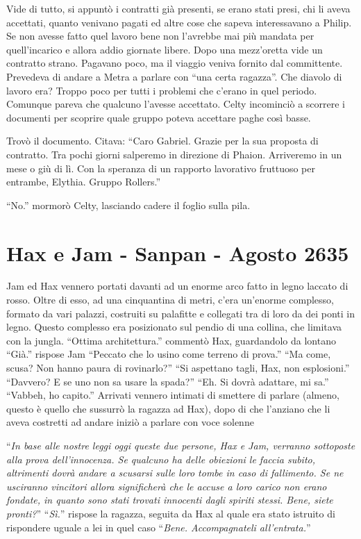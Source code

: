     Vide di tutto, si appuntò i contratti già presenti, se erano stati
    presi, chi li aveva accettati, quanto venivano pagati ed altre cose che
    sapeva interessavano a Philip. Se non avesse fatto quel lavoro bene non
    l'avrebbe mai più mandata per quell'incarico e allora addio giornate
    libere. Dopo una mezz'oretta vide un contratto strano. Pagavano poco,
    ma il viaggio veniva fornito dal committente. Prevedeva di andare a
    Metra a parlare con ``una certa ragazza''. Che diavolo di lavoro era?
    Troppo poco per tutti i problemi che c'erano in quel periodo. Comunque
    pareva che qualcuno l'avesse accettato. Celty incominciò a scorrere i
    documenti per scoprire quale gruppo poteva accettare paghe così basse.

    Trovò il documento. Citava: ``Caro Gabriel. Grazie per la sua proposta
    di contratto. Tra pochi giorni salperemo in direzione di Phaion.
    Arriveremo in un mese o giù di lì. Con la speranza di un rapporto
    lavorativo fruttuoso per entrambe, Elythia. Gruppo Rollers.''

    ``No.'' mormorò Celty, lasciando cadere il foglio sulla pila.

  \section{Hax e Jam - Sanpan - Agosto 2635}

    Jam ed Hax vennero portati davanti ad un enorme arco fatto in legno
    laccato di rosso. Oltre di esso, ad una cinquantina di metri, c'era
    un'enorme complesso, formato da vari palazzi, costruiti su palafitte e
    collegati tra di loro da dei ponti in legno. Questo complesso era
    posizionato sul pendio di una collina, che limitava con la jungla.
    ``Ottima architettura.'' commentò Hax, guardandolo da lontano ``Già.''
    rispose Jam ``Peccato che lo usino come terreno di prova.'' ``Ma come,
    scusa? Non hanno paura di rovinarlo?'' ``Si aspettano tagli, Hax, non
    esplosioni.'' ``Davvero? E se uno non sa usare la spada?'' ``Eh. Si
    dovrà adattare, mi sa.'' ``Vabbeh, ho capito.'' Arrivati vennero
    intimati di smettere di parlare (almeno, questo è quello che sussurrò
    la ragazza ad Hax), dopo di che l'anziano che li aveva costretti ad
    andare iniziò a parlare con voce solenne

    ``\emph{In base alle nostre leggi oggi queste due persone, Hax e Jam, verranno
    sottoposte alla prova dell'innocenza. Se qualcuno ha delle obiezioni
    le faccia subito, altrimenti dovrà andare a scusarsi sulle loro tombe
    in caso di fallimento. Se ne usciranno vincitori allora significherà
    che le accuse a loro carico non erano fondate, in quanto sono stati
    trovati innocenti dagli spiriti stessi. Bene, siete pronti?}''
    ``\emph{Sì.}'' rispose la ragazza, seguita da Hax al quale era stato
    istruito di rispondere uguale a lei in quel caso ``\emph{Bene.
    Accompagnateli all'entrata.}''
    
